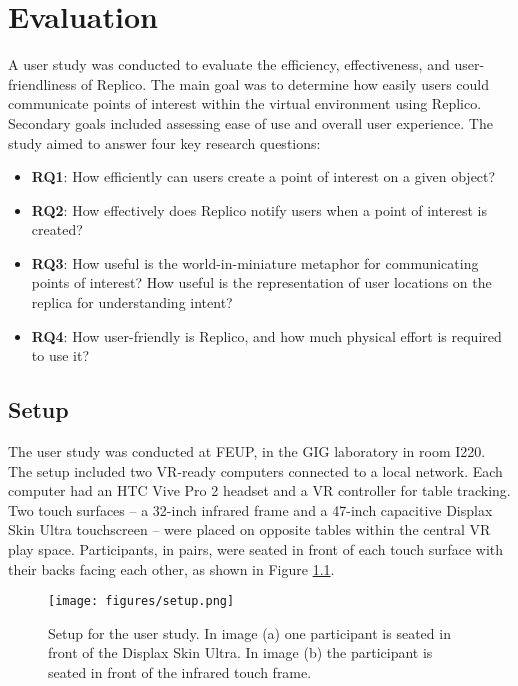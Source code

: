 \chapter{Evaluation}\label{chap:eval}

A user study was conducted to evaluate the efficiency, effectiveness, and user-friendliness of Replico. The main goal was to determine how easily users could communicate points of interest within the virtual environment using Replico. Secondary goals included assessing ease of use and overall user experience. The study aimed to answer four key research questions:

\begin{itemize}
    \item \textbf{RQ1}: How efficiently can users create a point of interest on a given object?
    \item \textbf{RQ2}: How effectively does Replico notify users when a point of interest is created?
    \item \textbf{RQ3}: How useful is the world-in-miniature metaphor for communicating points of interest? How useful is the representation of user locations on the replica for understanding intent?
    \item \textbf{RQ4}: How user-friendly is Replico, and how much physical effort is required to use it? 
\end{itemize}

\section{Setup}


    The user study was conducted at FEUP, in the GIG laboratory in room I220. The setup included two VR-ready computers connected to a local network. Each computer had an HTC Vive Pro 2 headset and a VR controller for table tracking. Two touch surfaces -- a 32-inch infrared frame and a 47-inch capacitive Displax Skin Ultra touchscreen -- were placed on opposite tables within the central VR play space. Participants, in pairs, were seated in front of each touch surface with their backs facing each other, as shown in Figure \ref{fig:eval_setup}.

    \begin{figure}[h]
        \centering
        \texttt{[image: figures/setup.png]}
        \caption{Setup for the user study. In image (a) one participant is seated in front of the Displax Skin Ultra. In image (b) the participant is seated in front of the infrared touch frame.}
        \label{fig:eval_setup}
    \end{figure}

